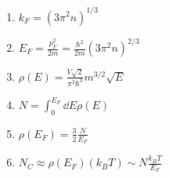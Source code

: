 

\vspace*{\fill}
\centering

\begin{enumerate}
    \item $\displaystyle k_{F} = (3 \pi^2 n)^{1/3}$ 
    \item $\displaystyle E_{F} = \frac{p_{F}^2}{2m} = \frac{\hbar^2}{2m} (3\pi^2n)^{2/3}$
    \item $\displaystyle \rho(E) = \frac{V\sqrt{2}}{\pi^2\hbar^3}m^{3/2}\sqrt{E}$
    \item $\displaystyle N = \int_{0}^{E_{F}} \dd{E} \rho(E)$
    \item $\displaystyle \rho(E_{F}) = \frac{3}{2}\frac{N}{E_{F}}$
    \item $\displaystyle N_{C} \approx \rho(E_{F})(k_{B}T) \sim N \frac{k_{B}T}{E_{F}}$
\end{enumerate}

\centering
\vspace*{\fill}

